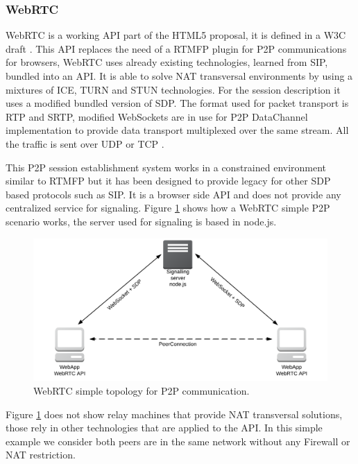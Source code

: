 \subsubsection{WebRTC}

WebRTC is a working API part of the HTML5 proposal, it is defined in a W3C draft \cite{webrtcW3cgroup}. This API replaces the need of a RTMFP plugin for P2P communications for browsers, WebRTC uses already existing technologies, learned from SIP, bundled into an API. It is able to solve NAT transversal environments by using a mixtures of ICE, TURN and STUN technologies. For the session description it uses a modified bundled version of SDP. The format used for packet transport is RTP and SRTP, modified WebSockets are in use for P2P DataChannel implementation to provide data transport multiplexed over the same stream. All the traffic is sent over UDP or TCP \cite{alvestrandOverview2012}.

This P2P session establishment system works in a constrained environment similar to RTMFP but it has been designed to provide legacy for other SDP based protocols such as SIP. It is a browser side API and does not provide any centralized service for signaling. Figure \ref{fig:webrtcExample} shows how a WebRTC simple P2P scenario works, the server used for signaling is based in node.js.

 \begin{figure}[h]
  \centering
    \includegraphics[width=1\textwidth]{./figures/webrtcExample.png}
      \caption[WebRTC simple topology for P2P communication]{WebRTC simple topology for P2P communication.}
	\label{fig:webrtcExample}
\end{figure}

Figure \ref{fig:webrtcExample} does not show relay machines that provide NAT transversal solutions, those rely in other technologies that are applied to the API. In this simple example we consider both peers are in the same network without any Firewall or NAT restriction.

